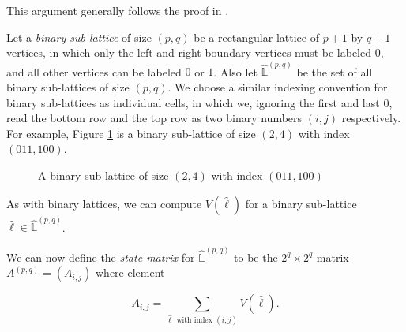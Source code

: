 \documentclass[12pt]{article}
\theoremstyle{plain}
\theoremstyle{definition}
\theoremstyle{remark}
\theoremstyle{definition}
\newcommand{\cell}[4]{ \draw[thick] ( #1 , #2 ) rectangle ( #3 , #4 );}
\newcommand{\lablvertex}[3]{\node[shape=circle,draw=none,fill=white, inner sep=2pt,minimum size=5pt] (A) at ( #1 , #2 ) {#3};}
\begin{document}
This argument generally follows the proof in \cite{Oh2014}.

Let a \textit{binary sub-lattice} of size $(p,q)$ be a rectangular lattice of $p+1$ by $q+1$ vertices, in which only the left and right boundary vertices must be labeled $0$, and all other vertices can be labeled $0$ or $1$. Also let $\hat{\mathbb{L}}^{(p,q)}$ be the set of all binary sub-lattices of size $(p,q)$. We choose a similar indexing convention for binary sub-lattices as individual cells, in which we, ignoring the first and last $0$, read the bottom row and the top row as two binary numbers $(i,j)$ respectively. For example, Figure \ref{fig:binary sub lattice example} is a binary sub-lattice of size $(2,4)$ with index $(011,100)$.

\begin{figure}[h!]
    \begin{center}
    \end{center}
\caption{A binary sub-lattice of size $(2,4)$ with index $(011,100)$}
\label{fig:binary sub lattice example}
\end{figure}

As with binary lattices, we can compute $V(\hat{\ell})$ for a binary sub-lattice $\hat{\ell} \in \hat{\mathbb{L}}^{(p,q)}$.

We can now define the \textit{state matrix} for $\hat{\mathbb{L}}^{(p,q)}$ to be the $2^{q} \times 2^{q}$ matrix $A^{(p,q)} = (A_{i,j})$ where element 

$$A_{i,j} = \sum_{\hat{\ell}\text{ with index } (i,j)}V(\hat{\ell}).$$
\end{document}
